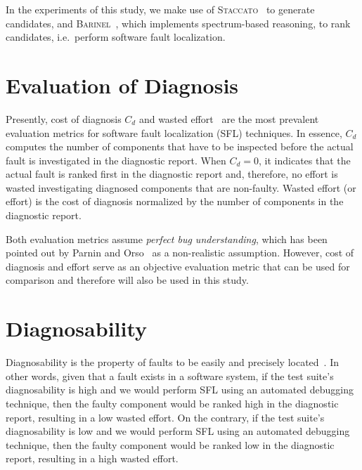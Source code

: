 \documentclass[twoside,a4paper,11pt]{memoir}
\begin{document}
In the experiments of this study, we make use of \textsc{Staccato}~\cite{conf/sara/AbreuG09} to generate candidates, and \textsc{Barinel}~\cite{Abreu:2009:SMF:1747491.1747511}, which implements spectrum-based reasoning, to rank candidates, i.e.\ perform software fault localization.

\section{Evaluation of Diagnosis}
Presently, cost of diagnosis \(C_d \) and wasted effort~\cite{Abreu:2009:SMF:1747491.1747511, 7390282, 6693085, Steimann:2013:TVV:2483760.2483767, DBLP:conf/icse/PerezAD17} are the most prevalent evaluation metrics for software fault localization (SFL) techniques.
In essence, \(C_d \) computes the number of components that have to be inspected before the actual fault is investigated in the diagnostic report.
When \(C_d = 0 \), it indicates that the actual fault is ranked first in the diagnostic report and, therefore, no effort is wasted investigating diagnosed components that are non-faulty.
Wasted effort (or effort) is the cost of diagnosis normalized by the number of components in the diagnostic report.

Both evaluation metrics assume \emph{perfect bug understanding}, which has been pointed out by Parnin and Orso~\cite{Parnin:2011:ADT:2001420.2001445} as a non-realistic assumption.
However, cost of diagnosis and effort serve as an objective evaluation metric that can be used for comparison and therefore will also be used in this study.

\section{Diagnosability}
Diagnosability is the property of faults to be easily and precisely located~\cite{730889}.
In other words, given that a fault exists in a software system, if the test suite's diagnosability is high and we would perform SFL using an automated debugging technique, then the faulty component would be ranked high in the diagnostic report, resulting in a low wasted effort.
On the contrary, if the test suite's diagnosability is low and we would perform SFL using an automated debugging technique, then the faulty component would be ranked low in the diagnostic report, resulting in a high wasted effort.
\end{document}
